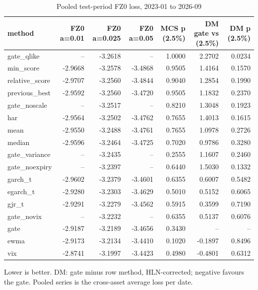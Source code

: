 \begin{table}[t]
\centering
\small
\caption{Pooled test-period FZ0 loss, 2023-01 to 2026-09}
\label{tab:main}
\begin{tabular}{lrrrrrr}
\toprule
method & FZ0 a=0.01 & FZ0 a=0.025 & FZ0 a=0.05 & MCS p (2.5\%) & DM gate vs (2.5\%) & DM p (2.5\%) \\
\midrule
gate\_qlike & -- & -3.2618 & -- & 1.0000 & 2.2702 & 0.0234 \\
min\_score & -2.9668 & -3.2578 & -3.4868 & 0.9505 & 1.4164 & 0.1570 \\
relative\_score & -2.9707 & -3.2560 & -3.4844 & 0.9040 & 1.2854 & 0.1990 \\
previous\_best & -2.9592 & -3.2560 & -3.4720 & 0.9505 & 1.1832 & 0.2370 \\
gate\_noscale & -- & -3.2517 & -- & 0.8210 & 1.3048 & 0.1923 \\
har & -2.9564 & -3.2502 & -3.4762 & 0.7655 & 1.4013 & 0.1615 \\
mean & -2.9550 & -3.2488 & -3.4761 & 0.7655 & 1.0978 & 0.2726 \\
median & -2.9596 & -3.2464 & -3.4725 & 0.7020 & 0.9786 & 0.3280 \\
gate\_variance & -- & -3.2435 & -- & 0.2555 & 1.1607 & 0.2460 \\
gate\_noexpiry & -- & -3.2397 & -- & 0.6440 & 1.5030 & 0.1332 \\
garch\_t & -2.9602 & -3.2379 & -3.4601 & 0.6355 & 0.6007 & 0.5482 \\
egarch\_t & -2.9280 & -3.2303 & -3.4629 & 0.5010 & 0.5152 & 0.6065 \\
gjr\_t & -2.9291 & -3.2279 & -3.4562 & 0.5915 & 0.3599 & 0.7190 \\
gate\_novix & -- & -3.2232 & -- & 0.6355 & 0.5137 & 0.6076 \\
gate & -2.9187 & -3.2189 & -3.4656 & 0.3430 & -- & -- \\
ewma & -2.9173 & -3.2134 & -3.4410 & 0.1020 & -0.1897 & 0.8496 \\
vix & -2.8741 & -3.1997 & -3.4423 & 0.4980 & -0.4801 & 0.6312 \\
\bottomrule
\end{tabular}
\par\footnotesize Lower is better. DM: gate minus row method, HLN-corrected; negative favours the gate. Pooled series is the cross-asset average loss per date.
\end{table}
